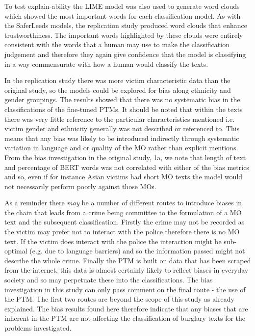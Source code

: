 To test explain-ability the LIME model was also used to generate word clouds which showed the most important words for each classification model. As with the SaferLeeds models, the replication study produced word clouds that enhance trustworthiness. The important words highlighted by these clouds were entirely consistent with the words that a human may use to make the classification judgement and therefore they again give confidence that the model is classifying in a way commensurate with how a human would classify the texts.

In the replication study there was more victim characteristic data than the original study, so the models could be explored for bias along ethnicity and gender groupings. The results showed that there was no systematic bias in the classifications of the fine-tuned PTMs. It should be noted that within the texts there was very little reference to the particular characteristics mentioned i.e. victim gender and ethnicity generally was not described or referenced to. This means that any bias was likely to be introduced indirectly through systematic variation in language and or quality of the MO rather than explicit mentions. From the bias investigation in the original study, 1a,  we note that length of text and percentage of BERT words was not correlated with either of the bias metrics and so, even if for instance Asian victims had short MO texts the model would not necessarily perform poorly against those MOs. 

As a reminder there \emph{may} be a number of different routes to introduce biases in the chain that leads from a crime being committee to the formulation of a MO text and the subsequent classification. Firstly the crime may not be recorded as the victim may prefer not to interact with the police therefore there is no MO text. If the victim does interact with the police the interaction might be sub-optimal (e.g. due to language barriers) and so the information passed might not describe the whole crime. Finally the PTM is built on data that has been scraped from the internet, this data is almost certainly likely to reflect biases in everyday society and so may perpetuate these into the classifications. The bias investigation in this study can only pass comment on the final route - the use of the PTM. The first two routes are beyond the scope of this study as already explained. The bias results found here therefore indicate that any biases that are inherent in the PTM are not affecting the classification of burglary texts for the problems investigated. 

